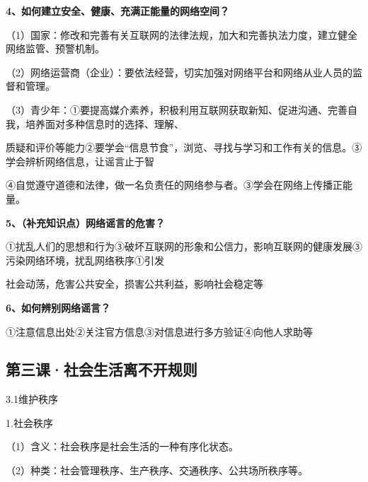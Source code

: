 \documentclass[lang=cn,11pt]{elegantbook}
\newcommand{\daofasym}[1]{{\daofasymbolfont #1}}
\newcommand{\daofasym}[1]{#1}
\begin{document}
\textbf{4、如何建立安全、健康、充满正能量的网络空间？}\par

（1）国家：修改和完善有关互联网的法律法规，加大和完善执法力度，建立健全网络监管、预警机制。\par

（2）网络运营商（企业）：要依法经营，切实加强对网络平台和网络从业人员的监督和管理。\par

（3）青少年：\daofasym{①}要提高媒介素养，积极利用互联网获取新知、促进沟通、完善自我，培养面对多种信息时的选择、理解、\par

质疑和评价等能力\daofasym{②}要学会“信息节食”，浏览、寻找与学习和工作有关的信息。\daofasym{③}学会辨析网络信息，让谣言止于智\par

\daofasym{④}自觉遵守道德和法律，做一名负责任的网络参与者。\daofasym{③}学会在网络上传播正能量。\par

\textbf{5、（补充知识点）网络谣言的危害？}\par

\daofasym{①}扰乱人们的思想和行为\daofasym{③}破坏互联网的形象和公信力，影响互联网的健康发展\daofasym{③}污染网络环境，扰乱网络秩序\daofasym{①}引发\par

社会动荡，危害公共安全，损害公共利益，影响社会稳定等\par

\textbf{6、如何辨别网络谣言？}\par

\daofasym{①}注意信息出处\daofasym{②}关注官方信息\daofasym{③}对信息进行多方验证\daofasym{④}向他人求助等\par

\subsection*{第三课·社会生活离不开规则}

3.1维护秩序\par

1.社会秩序\par

（1）含义：社会秩序是社会生活的一种有序化状态。\par

（2）种类：社会管理秩序、生产秩序、交通秩序、公共场所秩序等。\par
\end{document}
